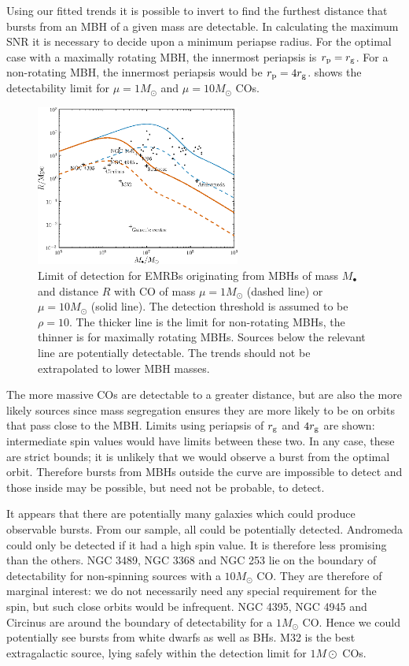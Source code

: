 Using our fitted trends it is possible to invert  to find the furthest distance that bursts from an MBH of a given mass are detectable. In calculating the maximum SNR it is necessary to decide upon a minimum periapse radius. For the optimal case with a maximally rotating MBH, the innermost periapsis is $r_\mathrm{p} = r_\mathrm{g}$. For a non-rotating MBH, the innermost periapsis would be $r_\mathrm{p} = 4r_\mathrm{g}$.  shows the detectability limit for $\mu = 1 M_\odot$ and $\mu = 10 M_\odot$ COs.
\begin{figure}[!htp]
\begin{center}
 \includegraphics[width=0.6\textwidth]{./images/Fig_M_R_detect_1}
 \caption{Limit of detection for EMRBs originating from MBHs of mass $M_\bullet$ and distance $R$ with CO of mass $\mu = 1 M_\odot$ (dashed line) or $\mu = 10 M_\odot$ (solid line). The detection threshold is assumed to be $\rho = 10$. The thicker line is the limit for non-rotating MBHs, the thinner is for maximally rotating MBHs. Sources below the relevant line are potentially detectable. The trends should not be extrapolated to lower MBH masses.\label{fig:detect}}
   \end{center}
\end{figure}
The more massive COs are detectable to a greater distance, but are also the more likely sources since mass segregation ensures they are more likely to be on orbits that pass close to the MBH. Limits using periapsis of $r_\mathrm{g}$ and $4r_\mathrm{g}$ are shown: intermediate spin values would have limits between these two. In any case, these are strict bounds; it is unlikely that we would observe a burst from the optimal orbit. Therefore bursts from MBHs outside the curve are impossible to detect and those inside may be possible, but need not be probable, to detect.

It appears that there are potentially many galaxies which could produce observable bursts. From our sample, all could be potentially detected. Andromeda could only be detected if it had a high spin value. It is therefore less promising than the others. NGC 3489, NGC 3368 and NGC 253 lie on the boundary of detectability for non-spinning sources with a $10 M_\odot$ CO. They are therefore of marginal interest: we do not necessarily need any special requirement for the spin, but such close orbits would be infrequent. NGC 4395, NGC 4945 and Circinus are around the boundary of detectability for a $1 M_\odot$ CO. Hence we could potentially see bursts from white dwarfs as well as BHs. M32 is the best extragalactic source, lying safely within the detection limit for $1 M\odot$ COs.

